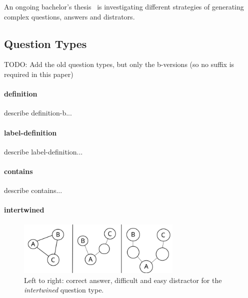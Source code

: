 \documentclass{IOS-Book-Article}     %
\newcommand{\citep}{\cite}%
\begin{document}
An ongoing bachelor's thesis~\citep{snikquiz} is investigating different strategies of generating complex questions, answers and distrators.

\subsection{Question Types}

TODO: Add the old question types, but only the b-versions (so no suffix is required in this paper)

\paragraph{definition}
describe definition-b...

\paragraph{label-definition}
describe label-definition...

\paragraph{contains}
describe contains...

\paragraph{intertwined}

\begin{figure}
\includegraphics[width=0.7\textwidth]{img/intertwined_cml.png} 
\caption{Left to right: correct answer, difficult and easy distractor for the \emph{intertwined} question type.}
\label{fig:intertwined}
\end{figure}
\end{document}
